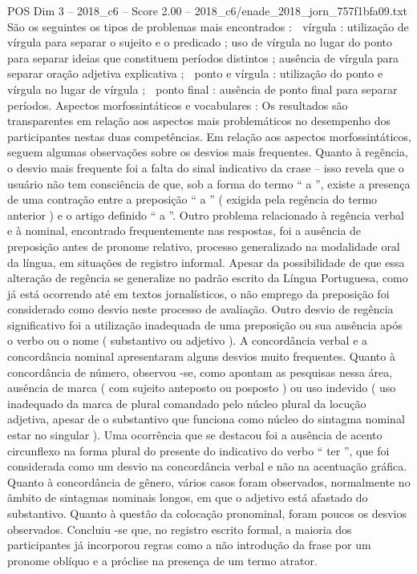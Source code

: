 \begin{textsample}{POS Dim 3 – 2018\_c6 – Score 2.00 – 2018\_c6/enade\_2018\_jorn\_757f1bfa09.txt}
São os seguintes os tipos de problemas mais encontrados :  vírgula : utilização de vírgula para separar o sujeito e o predicado ; uso de vírgula no lugar do ponto para separar ideias que constituem períodos distintos ; ausência de vírgula para separar oração adjetiva explicativa ;  ponto e vírgula : utilização do ponto e vírgula no lugar de vírgula ;  ponto final : ausência de ponto final para separar períodos.
Aspectos morfossintáticos e vocabulares : Os resultados são transparentes em relação aos aspectos mais problemáticos no desempenho dos participantes nestas duas competências.
Em relação aos aspectos morfossintáticos, seguem algumas observações sobre os desvios mais frequentes.
Quanto à regência, o desvio mais frequente foi a falta do sinal indicativo da crase – isso revela que o usuário não tem consciência de que, sob a forma do termo “ a ”, existe a presença de uma contração entre a preposição “ a ” ( exigida pela regência do termo anterior ) e o artigo definido “ a ”.
Outro problema relacionado à regência verbal e à nominal, encontrado frequentemente nas respostas, foi a ausência de preposição antes de pronome relativo, processo generalizado na modalidade oral da língua, em situações de registro informal.
Apesar da possibilidade de que essa alteração de regência se generalize no padrão escrito da Língua Portuguesa, como já está ocorrendo até em textos jornalísticos, o não emprego da preposição foi considerado como desvio neste processo de avaliação.
Outro desvio de regência significativo foi a utilização inadequada de uma preposição ou sua ausência após o verbo ou o nome ( substantivo ou adjetivo ).
A concordância verbal e a concordância nominal apresentaram alguns desvios muito frequentes.
Quanto à concordância de número, observou -se, como apontam as pesquisas nessa área, ausência de marca ( com sujeito anteposto ou posposto ) ou uso indevido ( uso inadequado da marca de plural comandado pelo núcleo plural da locução adjetiva, apesar de o substantivo que funciona como núcleo do sintagma nominal estar no singular ).
Uma ocorrência que se destacou foi a ausência de acento circunflexo na forma plural do presente do indicativo do verbo “ ter ”, que foi considerada como um desvio na concordância verbal e não na acentuação gráfica.
Quanto à concordância de gênero, vários casos foram observados, normalmente no âmbito de sintagmas nominais longos, em que o adjetivo está afastado do substantivo.
Quanto à questão da colocação pronominal, foram poucos os desvios observados.
Concluiu -se que, no registro escrito formal, a maioria dos participantes já incorporou regras como a não introdução da frase por um pronome oblíquo e a próclise na presença de um termo atrator.

\end{textsample}
